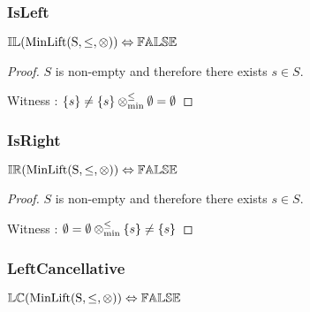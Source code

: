 \documentclass[../Summary.tex]{subfiles}
\begin{document}
\subsubsection{IsLeft}

\begin{theorem} \label{thm:minlift_il}
${\mathbb{IL}}(\mathrm{MinLift(S,\leq,\otimes)}) \Leftrightarrow {\mathbb{FALSE}}$
\end{theorem}

\begin{proof}

\vspace{0.5em}

$S$ is non-empty and therefore there exists $s \in S$.

\vspace{0.5em}

Witness : $\{s\} \neq \{s\} \mathbin{\otimes_{\min}^{\leq}} \emptyset = \emptyset$
\end{proof}





\subsubsection{IsRight}

\begin{theorem} \label{thm:minlift_ir}
${\mathbb{IR}}(\mathrm{MinLift(S,\leq,\otimes)}) \Leftrightarrow {\mathbb{FALSE}}$
\end{theorem}

\begin{proof}

\vspace{0.5em}

$S$ is non-empty and therefore there exists $s \in S$.

\vspace{0.5em}

Witness : $\emptyset = \emptyset \mathbin{\otimes_{\min}^{\leq}} \{s\} \neq \{s\}$
\end{proof}





\subsubsection{LeftCancellative}

\begin{theorem} \label{thm:minlift_lc}
${\mathbb{LC}}(\mathrm{MinLift(S,\leq,\otimes)}) \Leftrightarrow {\mathbb{FALSE}}$
\end{theorem}
\end{document}
